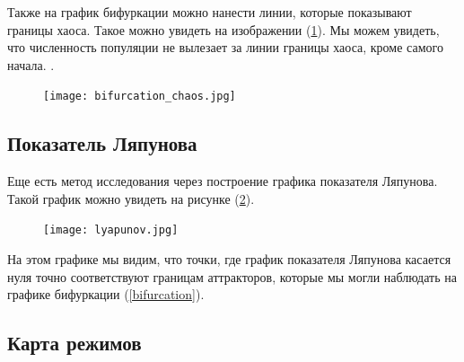 
        Также на график бифуркации можно нанести линии, которые показывают границы хаоса. Такое можно увидеть на изображении (\ref{bifurcation_chaos}). Мы можем увидеть, что численность популяции не вылезает за линии границы хаоса, кроме самого начала. .

        \begin{figure}
            \centering
            \texttt{[image: bifurcation\_chaos.jpg]}

            \captionsetup{justification=centering}
            \caption{}
            \label{bifurcation_chaos}
        \end{figure}

    \subsection{Показатель Ляпунова}    

        Еще есть метод исследования через построение графика показателя Ляпунова. Такой график можно увидеть на рисунке (\ref{lyapunov}).

        \begin{figure}
            \centering
            \texttt{[image: lyapunov.jpg]}

            \captionsetup{justification=centering}
            \caption{}
            \label{lyapunov}
        \end{figure}

        На этом графике мы видим, что точки, где график показателя Ляпунова касается нуля точно соответствуют границам аттракторов, которые мы могли наблюдать на графике бифуркации (\ref{bifurcation}).

    \subsection{Карта режимов}

